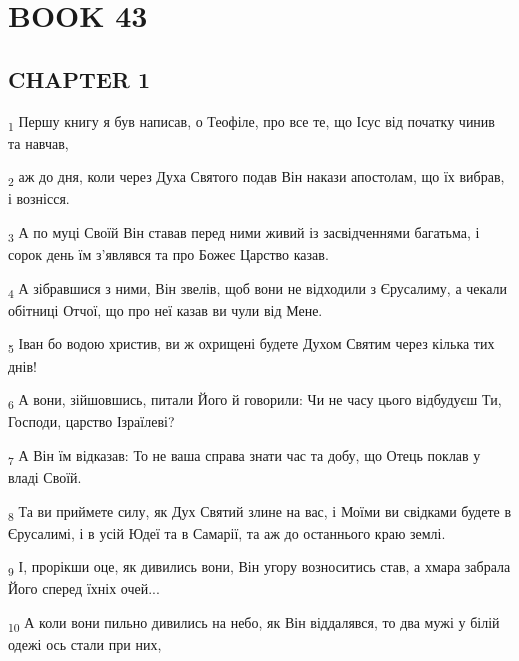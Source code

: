 \section{BOOK 43}
\subsection{CHAPTER 1}
\begin{tcolorbox}
\textsubscript{1} Першу книгу я був написав, о Теофіле, про все те, що Ісус від початку чинив та навчав,
\end{tcolorbox}
\begin{tcolorbox}
\textsubscript{2} аж до дня, коли через Духа Святого подав Він накази апостолам, що їх вибрав, і вознісся.
\end{tcolorbox}
\begin{tcolorbox}
\textsubscript{3} А по муці Своїй Він ставав перед ними живий із засвідченнями багатьма, і сорок день їм з'являвся та про Божеє Царство казав.
\end{tcolorbox}
\begin{tcolorbox}
\textsubscript{4} А зібравшися з ними, Він звелів, щоб вони не відходили з Єрусалиму, а чекали обітниці Отчої, що про неї казав ви чули від Мене.
\end{tcolorbox}
\begin{tcolorbox}
\textsubscript{5} Іван бо водою христив, ви ж охрищені будете Духом Святим через кілька тих днів!
\end{tcolorbox}
\begin{tcolorbox}
\textsubscript{6} А вони, зійшовшись, питали Його й говорили: Чи не часу цього відбудуєш Ти, Господи, царство Ізраїлеві?
\end{tcolorbox}
\begin{tcolorbox}
\textsubscript{7} А Він їм відказав: То не ваша справа знати час та добу, що Отець поклав у владі Своїй.
\end{tcolorbox}
\begin{tcolorbox}
\textsubscript{8} Та ви приймете силу, як Дух Святий злине на вас, і Моїми ви свідками будете в Єрусалимі, і в усій Юдеї та в Самарії, та аж до останнього краю землі.
\end{tcolorbox}
\begin{tcolorbox}
\textsubscript{9} І, прорікши оце, як дивились вони, Він угору возноситись став, а хмара забрала Його сперед їхніх очей...
\end{tcolorbox}
\begin{tcolorbox}
\textsubscript{10} А коли вони пильно дивились на небо, як Він віддалявся, то два мужі у білій одежі ось стали при них,
\end{tcolorbox}
